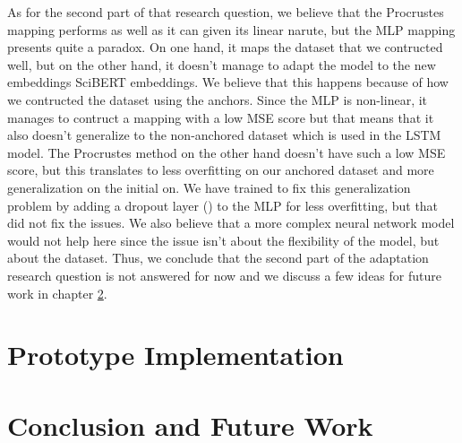 \documentclass[12pt]{extreport}
\begin{document}
As for the second part of that research question, we believe that the Procrustes mapping performs as well as it can given its linear narute, but the MLP mapping presents quite a paradox. On one hand, it maps the dataset that we contructed well, but on the other hand, it doesn't manage to adapt the model to the new embeddings SciBERT embeddings. We believe that this happens because of how we contructed the dataset using the anchors. Since the MLP is non-linear, it manages to contruct a mapping with a low MSE score but that means that it also doesn't generalize to the non-anchored dataset which is used in the LSTM model. The Procrustes method on the other hand doesn't have such a low MSE score, but this translates to less overfitting on our anchored dataset and more generalization on the initial on. We have trained to fix this generalization problem by adding a dropout layer (\cite{dropout}) to the MLP for less overfitting, but that did not fix the issues. We also believe that a more complex neural network model would not help here since the issue isn't about the flexibility of the model, but about the dataset. Thus, we conclude that the second part of the adaptation research question is not answered for now and we discuss a few ideas for future work in chapter \ref{sec:conclusion}.

\chapter{Prototype Implementation} \label{sec:prototype}

\chapter{Conclusion and Future Work} \label{sec:conclusion}



\end{document}
